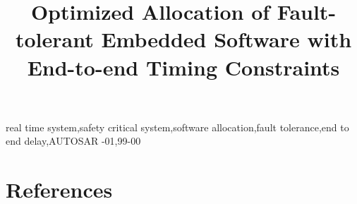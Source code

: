 \documentclass[preprint]{elsarticle}
\begin{document}
\sloppy
\begin{frontmatter}
\title{Optimized Allocation of Fault-tolerant Embedded Software with End-to-end Timing Constraints}


\begin{keyword}
real time system\sep safety critical system\sep software allocation\sep fault tolerance\sep end to end delay\sep AUTOSAR
-01\sep  99-00
\end{keyword}
\end{frontmatter}










\pagebreak
\section*{References}


\end{document}
